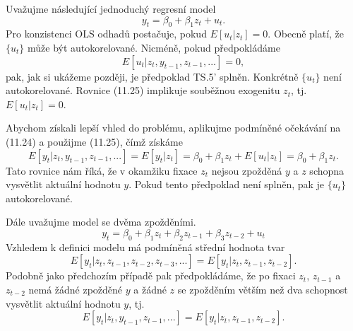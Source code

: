 Uvažujme následující jednoduchý regresní model
\begin{equation}
y_t = \beta_0 + \beta_1 z_t + u_t.
\end{equation}
Pro konzistenci OLS odhadů postačuje, pokud $E[u_t | z_t] = 0$. Obecně platí, že $\{u_t\}$ může být autokorelované. Nicméně, pokud předpokládáme
\begin{equation}
E[u_t|z_t, y_{t - 1}, z_{t - 1}, ...] = 0,
\end{equation}
pak, jak si ukážeme později, je předpoklad TS.5' splněn. Konkrétně $\{u_t\}$ není autokorelované. Rovnice (11.25) implikuje souběžnou exogenitu $z_t$, tj. $E[u_t|z_t] = 0$.

Abychom získali lepší vhled do problému, aplikujme podmíněné očekávání na (11.24) a použijme (11.25), čímž získáme
\begin{equation}
E[y_t|z_t, y_{t - 1}, z_{t - 1}, ...] = E[y_t | z_t] = \beta_0 + \beta_1 z_t + E[u_t|z_t] = \beta_0 + \beta_1 z_t.
\end{equation}
Tato rovnice nám říká, že v okamžiku fixace $z_t$ nejsou zpožděná $y$ a $z$ schopna vysvětlit aktuální hodnotu $y$. Pokud tento předpoklad není splněn, pak je $\{u_t\}$ autokorelované.

Dále uvažujme model se dvěma zpožděními.
\begin{equation}
y_t = \beta_0 + \beta_1 z_t + \beta_2 z_{t - 1} + \beta_3 z_{t - 2} + u_t
\end{equation}
Vzhledem k definici modelu má podmíněná střední hodnota tvar
\begin{equation}
E[y_t | z_t, z_{t - 1}, z_{t - 2}, z_{t - 3}, ...] = E[y_t | z_t, z_{t - 1}, z_{t - 2}].
\end{equation}
Podobně jako předchozím případě pak předpokládáme, že po fixaci $z_t$, $z_{t - 1}$ a $z_{t - 2}$ nemá žádné zpožděné $y$ a žádné $z$ se zpožděním větším než dva schopnost vysvětlit aktuální hodnotu $y$, tj.
\begin{equation}
E[y_t| z_t, y_{t - 1}, z_{t - 1}, ...] = E[y_t | z_t, z_{t - 1}, z_{t - 2}].
\end{equation}

